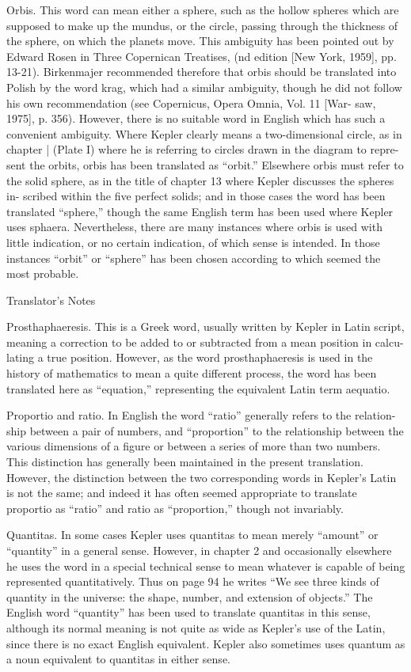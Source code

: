 \documentclass{article}
\begin{document}
Orbis. This word can mean either a sphere, such as the hollow spheres which are
supposed to make up the mundus, or the circle, passing through the thickness of
the sphere, on which the planets move. This ambiguity has been pointed out by
Edward Rosen in Three Copernican Treatises, (nd edition [New York, 1959],
pp. 13-21). Birkenmajer recommended therefore that orbis should be translated
into Polish by the word krag, which had a similar ambiguity, though he did not
follow his own recommendation (see Copernicus, Opera Omnia, Vol. 11 [War-
saw, 1975], p. 356). However, there is no suitable word in English which has such
a convenient ambiguity. Where Kepler clearly means a two-dimensional circle, as
in chapter | (Plate I) where he is referring to circles drawn in the diagram to repre-
sent the orbits, orbis has been translated as “orbit.” Elsewhere orbis must refer to
the solid sphere, as in the title of chapter 13 where Kepler discusses the spheres in-
scribed within the five perfect solids; and in those cases the word has been
translated “sphere,” though the same English term has been used where Kepler
uses sphaera. Nevertheless, there are many instances where orbis is used with little
indication, or no certain indication, of which sense is intended. In those instances
“orbit” or “sphere” has been chosen according to which seemed the most probable.

Translator’s Notes

Prosthaphaeresis. This is a Greek word, usually written by Kepler in Latin script,
meaning a correction to be added to or subtracted from a mean position in calcu-
lating a true position. However, as the word prosthaphaeresis is used in the
history of mathematics to mean a quite different process, the word has been
translated here as “equation,” representing the equivalent Latin term aequatio.

Proportio and ratio. In English the word “ratio” generally refers to the relation-
ship between a pair of numbers, and “proportion” to the relationship between the
various dimensions of a figure or between a series of more than two numbers.
This distinction has generally been maintained in the present translation.
However, the distinction between the two corresponding words in Kepler’s Latin
is not the same; and indeed it has often seemed appropriate to translate proportio
as “ratio” and ratio as “proportion,” though not invariably.

Quantitas. In some cases Kepler uses quantitas to mean merely “amount” or
“quantity” in a general sense. However, in chapter 2 and occasionally elsewhere
he uses the word in a special technical sense to mean whatever is capable of being
represented quantitatively. Thus on page 94 he writes “We see three kinds of
quantity in the universe: the shape, number, and extension of objects.” The
English word “quantity” has been used to translate quantitas in this sense,
although its normal meaning is not quite as wide as Kepler’s use of the Latin,
since there is no exact English equivalent. Kepler also sometimes uses quantum as
a noun equivalent to quantitas in either sense.
\end{document}
